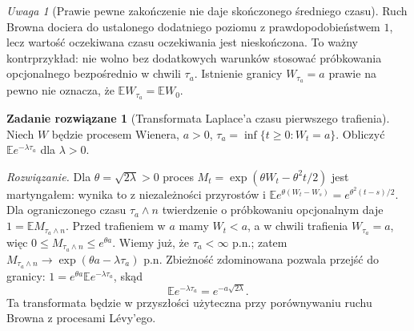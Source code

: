 \documentclass[11pt,a4paper,oneside]{report}
\numberwithin{equation}{chapter}
\theoremstyle{plain}
\theoremstyle{definition}
\newtheorem{zadanie}{Zadanie rozwiązane}[chapter]
\theoremstyle{remark}
\newtheorem{uwaga}{Uwaga}[chapter]
\newcommand{\E}{\mathbb{E}}
\begin{document}
\begin{uwaga}[Prawie pewne zakończenie nie daje skończonego średniego czasu]
Ruch Browna dociera do ustalonego dodatniego poziomu
z prawdopodobieństwem $1$, lecz wartość oczekiwana
czasu oczekiwania jest nieskończona.
To ważny kontrprzykład: nie wolno bez dodatkowych
warunków stosować próbkowania opcjonalnego bezpośrednio
w chwili $\tau_a$. Istnienie granicy $W_{\tau_a}=a$
prawie na pewno nie oznacza, że
$\E W_{\tau_a}=\E W_0$.
\end{uwaga}

\begin{zadanie}[Transformata Laplace'a czasu pierwszego trafienia]
Niech $W$ będzie procesem Wienera, $a>0$,
$\tau_a=\inf\{t\ge0:W_t=a\}$.
Obliczyć $\E e^{-\lambda\tau_a}$ dla $\lambda>0$.

\emph{Rozwiązanie.} Dla $\theta=\sqrt{2\lambda}>0$
proces $M_t=\exp(\theta W_t-\theta^2t/2)$
jest martyngałem: wynika to z niezależności przyrostów i
$\E e^{\theta(W_t-W_s)}=e^{\theta^2(t-s)/2}$.
Dla ograniczonego czasu $\tau_a\wedge n$ twierdzenie o
próbkowaniu opcjonalnym daje
$1=\E M_{\tau_a\wedge n}$.
Przed trafieniem w $a$ mamy $W_t<a$, a w chwili
trafienia $W_{\tau_a}=a$, więc
$0\le M_{\tau_a\wedge n}\le e^{\theta a}$.
Wiemy już, że $\tau_a<\infty$ p.n.; zatem
$M_{\tau_a\wedge n}\to\exp(\theta a-\lambda\tau_a)$
p.n. Zbieżność zdominowana pozwala przejść do granicy:
$1=e^{\theta a}\E e^{-\lambda\tau_a}$, skąd
\[
\E e^{-\lambda\tau_a}=e^{-a\sqrt{2\lambda}}.
\]
Ta transformata będzie w przyszłości użyteczna przy
porównywaniu ruchu Browna z procesami Lévy'ego.
\end{zadanie}
\end{document}
